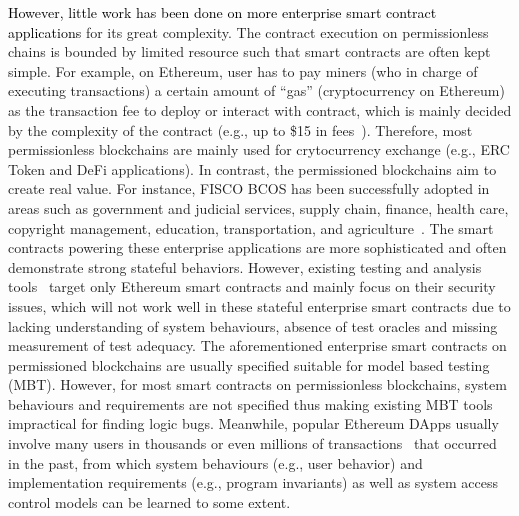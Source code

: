 \textcolor{black}{However, little work has been done on more enterprise smart contract applications} for its great complexity.
The contract execution on permissionless chains is bounded by limited resource such that smart contracts are often kept simple.
For example, on Ethereum, user has to pay miners (who in charge of executing transactions) a certain amount of ``gas'' (cryptocurrency on Ethereum) as the transaction fee to deploy or interact with contract, which is mainly decided by the complexity of the contract (e.g., up to \$15 in fees~\cite{gas-fee}).
Therefore, most permissionless blockchains are mainly used for crytocurrency exchange (e.g., ERC Token and DeFi applications).
In contrast, the permissioned blockchains aim to create real value.
For instance, FISCO BCOS has been successfully adopted in areas such as government and judicial services, supply chain, finance, health care, copyright management, education, transportation, and agriculture~\cite{fisco}.
The smart contracts powering these enterprise applications are more sophisticated and often demonstrate strong stateful behaviors.
However, existing testing and analysis tools~\cite{jiang2018contractfuzzer,oyente,securify,SmartCheck,wang2019vultron} target only Ethereum smart contracts and mainly focus on their security issues, which will not work well in these stateful enterprise smart contracts due to lacking understanding of system behaviours, absence of test oracles and missing measurement of test adequacy.
The aforementioned enterprise smart contracts on permissioned blockchains are usually specified suitable for model based testing (MBT).
However, for most smart contracts on permissionless blockchains, system behaviours and requirements are not specified thus making existing MBT tools impractical for finding logic bugs.
Meanwhile, popular Ethereum DApps usually involve many users in thousands or even millions of transactions~\cite{Etherscan} that occurred in the past, from which system behaviours (e.g., user behavior) and implementation requirements (e.g., program invariants) as well as system access control models can be learned to some extent.

